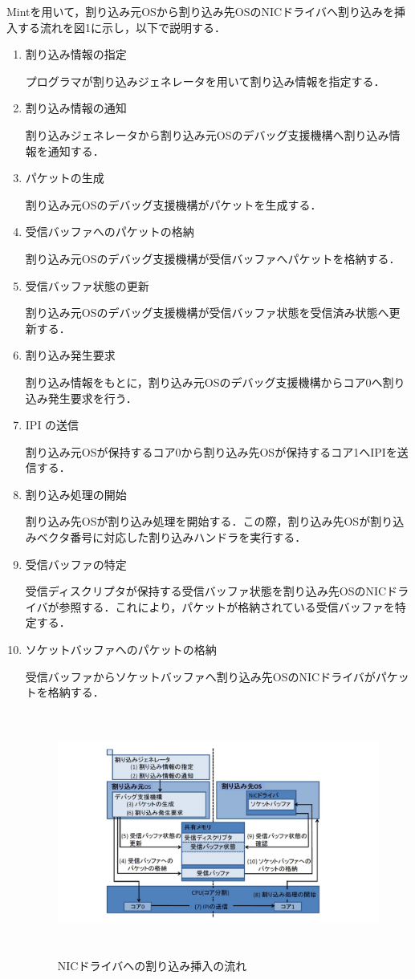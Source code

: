 \documentclass[12pt]{jsarticle}
\begin{document}
Mintを用いて，割り込み元OSから割り込み先OSのNICドライバへ割り込みを挿入する流れを図1に示し，以下で説明する．
\begin{enumerate}
\item 割り込み情報の指定

プログラマが割り込みジェネレータを用いて割り込み情報を指定する．
\item 割り込み情報の通知

割り込みジェネレータから割り込み元OSのデバッグ支援機構へ割り込み情報を通知する．
\item パケットの生成

割り込み元OSのデバッグ支援機構がパケットを生成する．
\item 受信バッファへのパケットの格納

割り込み元OSのデバッグ支援機構が受信バッファへパケットを格納する．
\item 受信バッファ状態の更新

割り込み元OSのデバッグ支援機構が受信バッファ状態を受信済み状態へ更新する．
\item 割り込み発生要求

割り込み情報をもとに，割り込み元OSのデバッグ支援機構からコア0へ割り込み発生要求を行う．
\item IPI の送信

割り込み元OSが保持するコア0から割り込み先OSが保持するコア1へIPIを送信する．
\item 割り込み処理の開始

割り込み先OSが割り込み処理を開始する．この際，割り込み先OSが割り込みベクタ番号に対応した割り込みハンドラを実行する．
\item 受信バッファの特定

受信ディスクリプタが保持する受信バッファ状態を割り込み先OSのNICドライバが参照する．これにより，パケットが格納されている受信バッファを特定する．
\item ソケットバッファへのパケットの格納

受信バッファからソケットバッファへ割り込み先OSのNICドライバがパケットを格納する．

\begin{figure}[t]
\begin{center}
\includegraphics[height=8.0cm]{./fig1.jpg}          
\caption{NICドライバへの割り込み挿入の流れ}
\label{fig:up}
\end{center}
\end{figure}



\end{enumerate}
\end{document}

